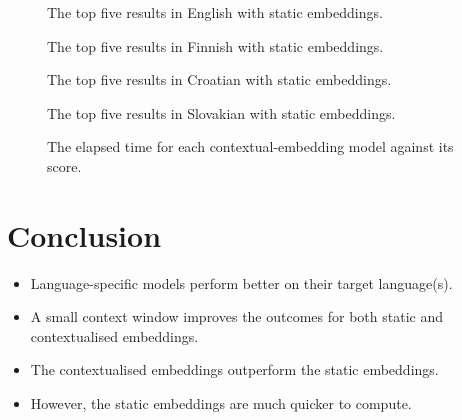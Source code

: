 \begin{figure}
  \centering
  \caption{The top five results in English with static embeddings.}
\end{figure}

\begin{figure}
  \centering
  \caption{The top five results in Finnish with static embeddings.}
\end{figure}

\begin{figure}
  \centering
  \caption{The top five results in Croatian with static embeddings.}
\end{figure}

\begin{figure}
  \centering
  \caption{The top five results in Slovakian with static embeddings.}
\end{figure}

\begin{figure}
  \centering
  \caption{The elapsed time for each contextual-embedding model against its score.}
\end{figure}

\section{Conclusion}

\begin{itemize}
  \item Language-specific models perform better on their target language(s).
  \item A small context window improves the outcomes for both static and contextualised embeddings.
  \item The contextualised embeddings outperform the static embeddings.
  \item However, the static embeddings are much quicker to compute.
\end{itemize}
